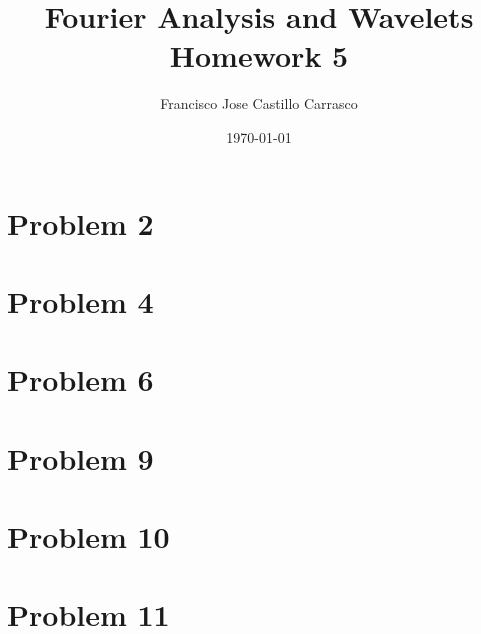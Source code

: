




\title{Fourier Analysis and Wavelets\\Homework 5}
\author{Francisco Jose Castillo Carrasco}
\date{\today}
\maketitle




\section*{Problem 2}


\section*{Problem 4}


\section*{Problem 6}


\section*{Problem 9}


\section*{Problem 10}


\section*{Problem 11}



